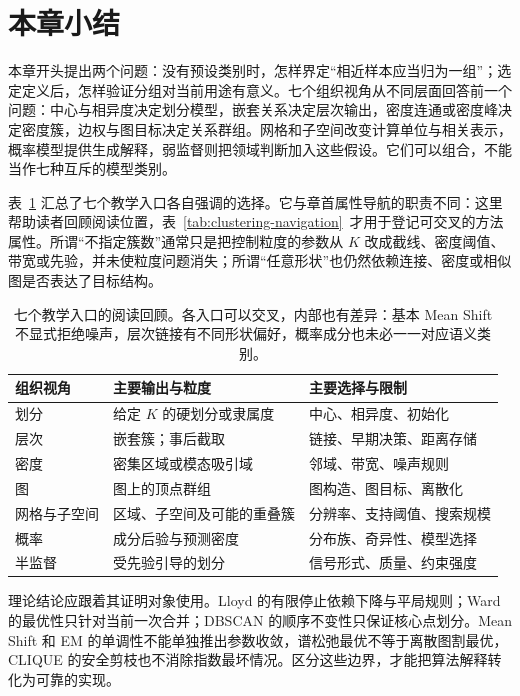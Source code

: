 \section{本章小结}
\label{sec:clustering-summary}

本章开头提出两个问题：没有预设类别时，怎样界定“相近样本应当归为一组”；选定定义后，怎样验证分组对当前用途有意义。七个组织视角从不同层面回答前一个问题：中心与相异度决定划分模型，嵌套关系决定层次输出，密度连通或密度峰决定密度簇，边权与图目标决定关系群组。网格和子空间改变计算单位与相关表示，概率模型提供生成解释，弱监督则把领域判断加入这些假设。它们可以组合，不能当作七种互斥的模型类别。

表~\ref{tab:clustering-overview} 汇总了七个教学入口各自强调的选择。它与章首属性导航的职责不同：这里帮助读者回顾阅读位置，表~\ref{tab:clustering-navigation}~才用于登记可交叉的方法属性。所谓“不指定簇数”通常只是把控制粒度的参数从 $K$ 改成截线、密度阈值、带宽或先验，并未使粒度问题消失；所谓“任意形状”也仍然依赖连接、密度或相似图是否表达了目标结构。

\begin{table}[htbp]
 \small
 \begin{tabularx}{\linewidth}{@{}p{19mm}>{\raggedright\arraybackslash}X>{\raggedright\arraybackslash}X@{}}
 \toprule
 组织视角 & 主要输出与粒度 & 主要选择与限制\\
 \midrule
 划分 & 给定 $K$ 的硬划分或隶属度 & 中心、相异度、初始化\\
 层次 & 嵌套簇；事后截取 & 链接、早期决策、距离存储\\
 密度 & 密集区域或模态吸引域 & 邻域、带宽、噪声规则\\
 图 & 图上的顶点群组 & 图构造、图目标、离散化\\
 网格与子空间 & 区域、子空间及可能的重叠簇 & 分辨率、支持阈值、搜索规模\\
 概率 & 成分后验与预测密度 & 分布族、奇异性、模型选择\\
 半监督 & 受先验引导的划分 & 信号形式、质量、约束强度\\
 \bottomrule
 \end{tabularx}
 \caption{七个教学入口的阅读回顾。各入口可以交叉，内部也有差异：基本 Mean Shift 不显式拒绝噪声，层次链接有不同形状偏好，概率成分也未必一一对应语义类别。}
 \label{tab:clustering-overview}
\end{table}

理论结论应跟着其证明对象使用。Lloyd 的有限停止依赖下降与平局规则；Ward 的最优性只针对当前一次合并；DBSCAN 的顺序不变性只保证核心点划分。Mean Shift 和 EM 的单调性不能单独推出参数收敛，谱松弛最优不等于离散图割最优，CLIQUE 的安全剪枝也不消除指数最坏情况。区分这些边界，才能把算法解释转化为可靠的实现。


